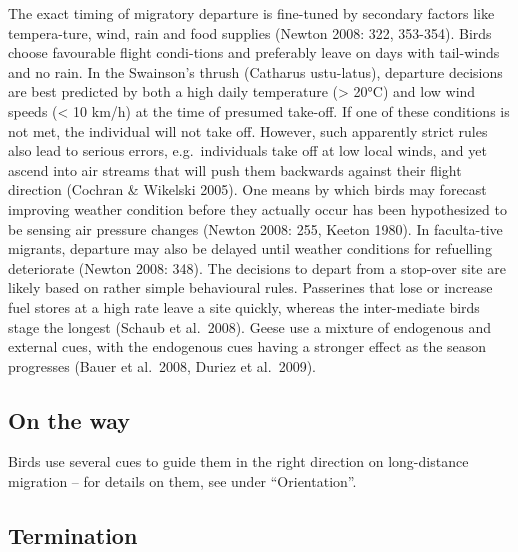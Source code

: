 \documentclass[
]{book}
\begin{document}
The exact timing of migratory departure is fine-tuned by secondary factors like tempera-ture, wind, rain and food supplies (Newton 2008: 322, 353-354). Birds choose favourable flight condi-tions and preferably leave on days with tail-winds and no rain. In the Swainson's thrush (Catharus ustu-latus), departure decisions are best predicted by both a high daily temperature (\textgreater{} 20°C) and low wind speeds (\textless{} 10 km/h) at the time of presumed take-off. If one of these conditions is not met, the individual will not take off. However, such apparently strict rules also lead to serious errors, e.g.~individuals take off at low local winds, and yet ascend into air streams that will push them backwards against their flight direction (Cochran \& Wikelski 2005).
One means by which birds may forecast improving weather condition before they actually occur has been hypothesized to be sensing air pressure changes (Newton 2008: 255, Keeton 1980). In faculta-tive migrants, departure may also be delayed until weather conditions for refuelling deteriorate (Newton 2008: 348).
The decisions to depart from a stop-over site are likely based on rather simple behavioural rules. Passerines that lose or increase fuel stores at a high rate leave a site quickly, whereas the inter-mediate birds stage the longest (Schaub et al.~2008). Geese use a mixture of endogenous and external cues, with the endogenous cues having a stronger effect as the season progresses (Bauer et al.~2008, Duriez et al.~2009).

\hypertarget{on-the-way}{%
\subsection{On the way}\label{on-the-way}}

Birds use several cues to guide them in the right direction on long-distance migration -- for details on them, see under ``Orientation''.

\hypertarget{termination}{%
\subsection{Termination}\label{termination}}
\end{document}

